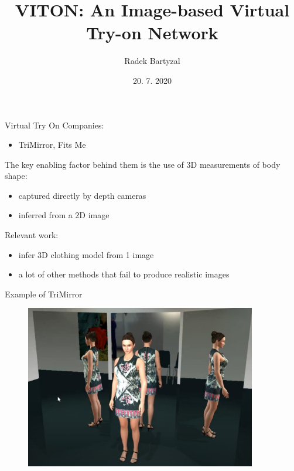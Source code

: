 \documentclass{beamer}
\begin{document}
\title[VITON]{VITON: An Image-based Virtual Try-on Network}  
\author{Radek Bartyzal}
\date{20. 7. 2020} 

\frame{\titlepage} 
\begin{frame}{Virtual Try On}
Companies:
\begin{itemize}
\item TriMirror, Fits Me
\end{itemize}

\vfill

The key enabling factor behind them is the use of 3D measurements of body shape:
\begin{itemize}
\item captured directly by depth cameras
\item inferred from a 2D image
\end{itemize}

\vfill

Relevant work:
\begin{itemize}
\item infer 3D clothing model from 1 image \cite{cit:3d}
\item a lot of other methods that fail to produce realistic images
\end{itemize}

\end{frame}
\begin{frame}{Example of TriMirror}

\begin{figure}[h]
\includegraphics[width=0.9\textwidth]{img/trimirror}
\end{figure}

\end{frame}
\end{document}
